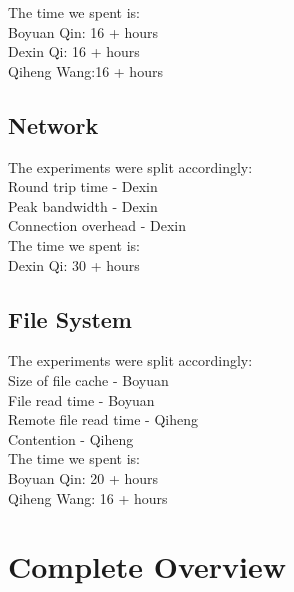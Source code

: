 \documentclass{article} %
\begin{document}
The time we spent is:\\
Boyuan Qin: 16 + hours\\
Dexin Qi: 16 + hours\\
Qiheng Wang:16 + hours

\subsection{Network}
The experiments were split accordingly:\\
Round trip time - Dexin\\
Peak bandwidth - Dexin\\
Connection overhead - Dexin\\

The time we spent is:\\
Dexin Qi: 30 + hours\\
\subsection{File System}
The experiments were split accordingly:\\
Size of file cache - Boyuan\\
File read time - Boyuan\\
Remote file read time - Qiheng \\
Contention - Qiheng\\

The time we spent is:\\
Boyuan Qin: 20 + hours\\
Qiheng Wang: 16 + hours\\

\section{Complete Overview}
\end{document}
